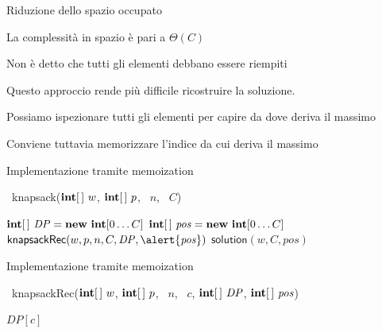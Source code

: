 \begin{frame}{Riduzione dello spazio occupato}

\vspace{-9pt}
\begin{myboxtitle}[Vantaggi]
\BIL
\item La complessità in spazio è pari a $\Theta(C)$
\item Non è detto che tutti gli elementi debbano essere riempiti
\EIL
\end{myboxtitle}

\begin{myboxtitle}[Svantaggi]
Questo approccio rende più difficile ricostruire la soluzione. 
\BIL
\item Possiamo ispezionare tutti gli elementi per capire da dove 
deriva il massimo
\item Conviene tuttavia memorizzare l'indice da cui deriva il massimo
\EIL
\end{myboxtitle}

\end{frame}

\begin{frame}{Implementazione tramite memoization}

\vspace{-9pt}
\begin{Procedure}
\caption[A]{\INTEGER\ \textsf{knapsack}($\INTEGER[\,]\ w$, $\INTEGER[\,]\ p$, \INTEGER\ $n$, \INTEGER\ $C$)}
  $\INTEGER[\,]\ \mathit{DP} = \NEW\ \INTEGER[0 \ldots C]$\;
  \alert{$\INTEGER[\,]\ \mathit{pos} = \NEW\ \INTEGER[0 \ldots C]$}\;
  $\textsf{knapsackRec}(w, p, n, C, \mathit{DP}, \alert{\mathit{pos}})$\;
  \Return \alert{$\textsf{solution}(w,C, \mathit{pos})$}\;
\end{Procedure}
\end{frame}



\begin{frame}{Implementazione tramite memoization}

\vspace{-9pt}
\begin{Procedure}
\caption[A]{\INTEGER\ \textsf{knapsackRec}($\INTEGER[\,]\ w$, $\INTEGER[\,]\ p$, \INTEGER\ $n$, \INTEGER\ $c$, $\INTEGER[\,]\ \mathit{DP}$, \alert{$\INTEGER[\,]\ \mathit{\mathit{pos}}$})}
\Return $\mathit{DP}[c]$\;
\end{Procedure}
\end{frame}


